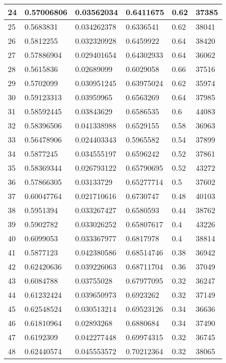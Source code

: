 \begin{longtable}{|l|l|l|l|l|l|}
24 & 0.57006806 & 0.03562034 & 0.6411675 & 0.62 & 37385 \\ \hline 
25 & 0.5683831 & 0.034262378 & 0.6336541 & 0.62 & 38041 \\ \hline 
26 & 0.5812255 & 0.032320928 & 0.6459922 & 0.64 & 38420 \\ \hline 
27 & 0.57886904 & 0.029401654 & 0.64302933 & 0.64 & 36062 \\ \hline 
28 & 0.5615836 & 0.02689099 & 0.6029058 & 0.66 & 37516 \\ \hline 
29 & 0.5702099 & 0.030951245 & 0.63975024 & 0.62 & 35974 \\ \hline 
30 & 0.59123313 & 0.03959965 & 0.6563269 & 0.64 & 37985 \\ \hline 
31 & 0.58592445 & 0.03843629 & 0.6586535 & 0.6 & 44083 \\ \hline 
32 & 0.58396506 & 0.041338988 & 0.6529155 & 0.58 & 36963 \\ \hline 
33 & 0.56478906 & 0.024403343 & 0.5965582 & 0.54 & 37899 \\ \hline 
34 & 0.5877245 & 0.034555197 & 0.6596242 & 0.52 & 37861 \\ \hline 
35 & 0.58369344 & 0.026793122 & 0.65790695 & 0.52 & 43272 \\ \hline 
36 & 0.57866305 & 0.03133729 & 0.65277714 & 0.5 & 37602 \\ \hline 
37 & 0.60047764 & 0.021710616 & 0.6730747 & 0.48 & 40103 \\ \hline 
38 & 0.5951394 & 0.033267427 & 0.6580593 & 0.44 & 38762 \\ \hline 
39 & 0.5902782 & 0.033026252 & 0.65807617 & 0.4 & 43226 \\ \hline 
40 & 0.6099053 & 0.033367977 & 0.6817978 & 0.4 & 38814 \\ \hline 
41 & 0.5877123 & 0.042380586 & 0.68514746 & 0.38 & 36942 \\ \hline 
42 & 0.62420636 & 0.039226063 & 0.68711704 & 0.36 & 37049 \\ \hline 
43 & 0.6084788 & 0.03755028 & 0.67977095 & 0.32 & 36247 \\ \hline 
44 & 0.61232424 & 0.039650973 & 0.6923262 & 0.32 & 37149 \\ \hline 
45 & 0.62548524 & 0.030513214 & 0.69523126 & 0.34 & 36636 \\ \hline 
46 & 0.61810964 & 0.02893268 & 0.6880684 & 0.34 & 37490 \\ \hline 
47 & 0.6192309 & 0.042277448 & 0.69974315 & 0.32 & 36745 \\ \hline 
48 & 0.62440574 & 0.045553572 & 0.70212364 & 0.32 & 38065 \\ \hline 

\end{longtable}
